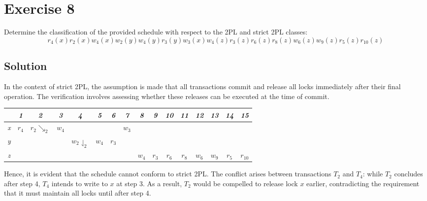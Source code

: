\section{Exercise 8}

Determine the classification of the provided schedule with respect to the 2PL and strict 2PL classes:
\[r_4(x) r_2(x) w_4(x) w_2(y) w_4(y) r_3(y) w_3(x) w_4(z) r_3(z) r_6(z) r_8(z) w_6(z) w_9(z) r_5(z) r_{10}(z)\]

\subsection*{Solution}
In the context of strict 2PL, the assumption is made that all transactions commit and release all locks immediately after their final operation. 
The verification involves assessing whether these releases can be executed at the time of commit.
\begin{table}[H]
    \centering
    \begin{tabular}{c|ccccccccccccccc}
                & \textit{1} & \textit{2} & \textit{3} & \textit{4} & \textit{5} & \textit{6} & \textit{7} & \textit{8} & \textit{9} & \textit{10} & \textit{11} & \textit{12} & \textit{13} & \textit{14} & \textit{15} \\ \hline
    \textit{x} & $r_4$      & $r_2\searrow _2$          & $w_4$      &                              &            &            & $w_3$      &            &            &             &             &             &             &             &             \\
    \textit{y} &            &                           &            & $w_2\downharpoonleft_2$      & $w_4$      & $r_3$      &            &            &            &             &             &             &             &             &             \\
    \textit{z} &            &                           &            &                              &            &            &            & $w_4$      & $r_3$      & $r_6$       & $r_8$       & $w_6$       & $w_9$       & $r_5$       & $r_{10}$     
    \end{tabular}%
\end{table}
Hence, it is evident that the schedule cannot conform to strict 2PL. 
The conflict arises between transactions $T_2$ and $T_4$: while $T_2$ concludes after step 4, $T_4$ intends to write to $x$ at step 3.
As a result, $T_2$ would be compelled to release lock $x$ earlier, contradicting the requirement that it must maintain all locks until after step 4.

